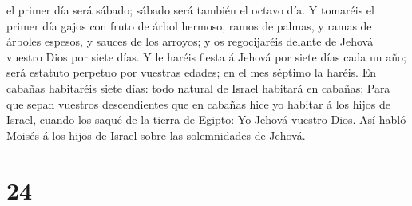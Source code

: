 el primer día será sábado; sábado será también el octavo día.
 Y tomaréis el primer día gajos con fruto de árbol hermoso,
ramos de palmas, y ramas de árboles espesos, y sauces de los arroyos; y
os regocijaréis delante de Jehová vuestro Dios por siete días.
 Y le haréis fiesta á Jehová por siete días cada un año;
será estatuto perpetuo por vuestras edades; en el mes séptimo la haréis.
 En cabañas habitaréis siete días: todo natural de Israel
habitará en cabañas;  Para que sepan vuestros descendientes
que en cabañas hice yo habitar á los hijos de Israel, cuando los saqué
de la tierra de Egipto: Yo Jehová vuestro Dios.  Así habló
Moisés á los hijos de Israel sobre las solemnidades de Jehová.

\hypertarget{section-23}{%
\section{24}\label{section-23}}

